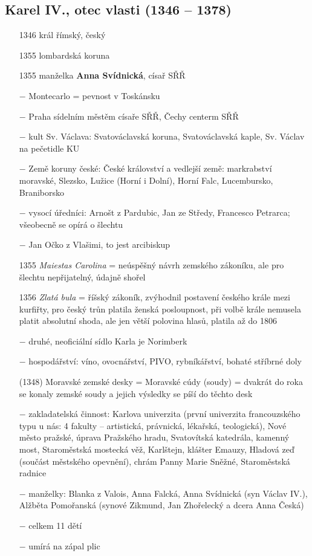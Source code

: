 \documentclass{article}
\begin{document}
\subsection*{Karel IV., otec vlasti (1346 -- 1378)}
\begin{itemize}
    \vspace{-0.5em}
    \setlength\itemsep{0.15em}
    \item[1346] král římský, český
    \item[1355] lombardská koruna
    \item[1355] manželka \textbf{Anna Svídnická}, císař SŘŘ
    \item[$-$] Montecarlo = pevnost v Toskánsku
    \item[$-$] Praha sídelním městěm císaře SŘŘ, Čechy centerm SŘŘ
    \item[$-$] kult Sv. Václava: Svatováclavská koruna, Svatováclavská kaple, Sv. Václav na pečetidle KU
    \item[$-$] Země koruny české: České království a vedlejší země: markrabství moravské, Slezsko, Lužice (Horní i Dolní), Horní Falc, Lucembursko, Braniborsko
    \item[$-$] vysocí úředníci: Arnošt z Pardubic, Jan ze Středy, Francesco Petrarca; všeobecně se opírá o šlechtu
    \item[$-$] Jan Očko z Vlašimi, to jest arcibiskup
    \item[1355] \textit{Maiestas Carolina} = neúspěšný návrh zemského zákoníku, ale pro šlechtu nepřijatelný, údajně shořel
    \item[1356]  \textit{Zlatá bula} = říšský zákoník, zvýhodnil postavení českého krále mezi kurfiřty, pro český trůn platila ženská posloupnost, při volbě krále nemusela platit absolutní shoda, ale jen větší polovina hlasů, platila až do 1806
    \item[$-$] druhé, neoficiální sídlo Karla je Norimberk
    \item[$-$] hospodářství: víno, ovocnářství, PIVO, rybníkářství, bohaté stříbrné doly
    \item[(1348)] Moravské zemské desky = Moravské cúdy (soudy) = dvakrát do roka se konaly zemské soudy a jejich výsledky se píší do těchto desk
    \item[$-$] zakladatelská činnost: Karlova univerzita (první univerzita francouzského typu u nás: 4 fakulty -- artistická, právnická, lékařská, teologická), Nové město pražské, úprava Pražského hradu, Svatovítská katedrála, kamenný most, Staroměstská mostecká věž, Karlštejn, klášter Emauzy, Hladová zeď (součást městského opevnění), chrám Panny Marie Sněžné, Staroměstská radnice
    \item[$-$] manželky: Blanka z Valois, Anna Falcká, Anna Svídnická (syn Václav IV.), Alžběta Pomořanská (synové Zikmund, Jan Zhořelecký a dcera Anna Česká)
    \item[$-$] celkem 11 dětí
    \item[$-$] umírá na zápal plic
\end{itemize}
\end{document}
